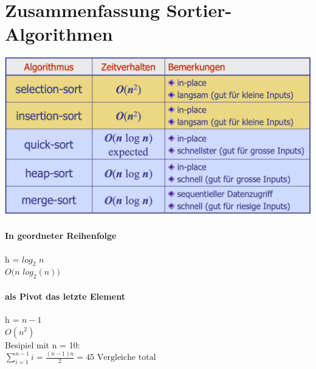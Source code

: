 \section{Zusammenfassung Sortier-Algorithmen}
\begin{center}
    \includegraphics[scale=.25]{graphic/05 QuickSort/zfsg.png}
\end{center}
\vspace{-8pt}

\paragraph{In geordneter Reihenfolge}
h = $log_2$ $n$\\
$O(n$ $log_2 (n))$

\paragraph{als Pivot das letzte Element}
h = $n - 1$\\
$O(n^2)$\\
Besipiel mit n = 10:\\
$\sum_{i=1}^{n-1} i=\frac{(n-1) n}{2}=45 \text { Vergleiche total }$

\vfill
$ $
\columnbreak
